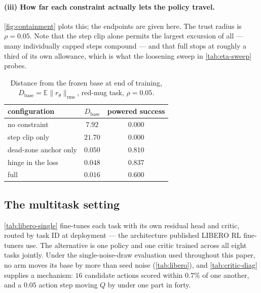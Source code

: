 \paragraph{(iii) How far each constraint actually lets the policy travel.}
\cref{fig:containment} plots this; the endpoints are given here. The trust
radius is $\rho = 0.05$. Note that the step clip alone permits the largest
excursion of all --- many individually capped steps compound --- and that full
\method{} stops at roughly a third of its own allowance, which is what the
loosening sweep in \cref{tab:eta-sweep} probes.

\begin{table}[h]
\centering
\caption{Distance from the frozen base at end of training,
$D_{\mathrm{base}}=\mathbb{E}\|r_\theta\|_{\mathrm{rms}}$, red-mug task,
$\rho = 0.05$.}
\label{tab:containment-endpoints}
\small
\begin{tabular}{lcc}
\toprule
configuration & $D_{\mathrm{base}}$ & powered success \\
\midrule
no constraint            & $7.92$   & 0.000 \\
step clip only           & $21.70$  & 0.000 \\
dead-zone anchor only    & $0.050$  & 0.810 \\
hinge in the loss        & $0.048$  & 0.837 \\
full \method{}           & $0.016$  & 0.600 \\
\bottomrule
\end{tabular}
\end{table}

\subsection{The multitask setting}
\label{app:multitask}

\cref{tab:libero-single} fine-tunes each task with its own residual head and
critic, routed by task ID at deployment --- the architecture published LIBERO
RL fine-tuners use. The alternative is one policy and one critic trained across
all eight tasks jointly. Under the single-noise-draw evaluation used throughout
this paper, no arm moves its base by more than seed noise
(\cref{tab:libero}), and \cref{tab:critic-diag} supplies a mechanism: $16$
candidate actions scored within $0.7\%$ of one another, and a $0.05$ action
step moving $Q$ by under one part in forty.

